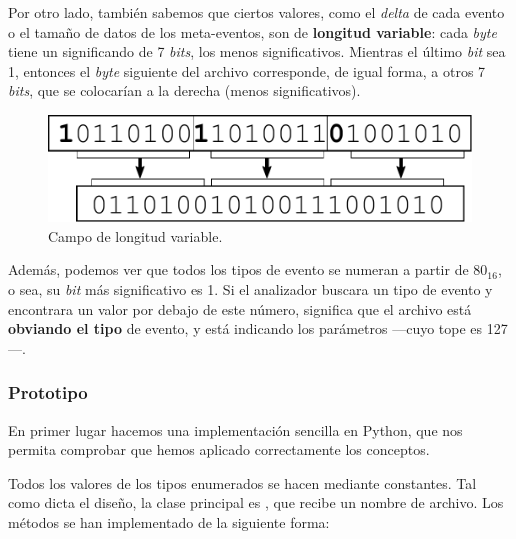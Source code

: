 \smallskip

Por otro lado, también sabemos que ciertos valores, como el \textit{delta} de cada evento o el tamaño de datos de los meta-eventos, son de \textbf{longitud variable}: cada \textit{byte} tiene un significando de 7 \textit{bits}, los menos significativos. Mientras el último \textit{bit} sea 1, entonces el \textit{byte} siguiente del archivo corresponde, de igual forma, a otros 7 \textit{bits}, que se colocarían a la derecha (menos significativos).

\smallskip

\begin{figure}[H]
	\noindent \begin{centering}
		\includegraphics[width=\linewidth/2]{capitulo5/varlen}
		\par\end{centering}
	\smallskip
	\caption{\label{fig:varlen} Campo de longitud variable.}
\end{figure}

\smallskip

Además, podemos ver que todos los tipos de evento se numeran a partir de $80_{16}$, o sea, su \textit{bit} más significativo es 1. Si el analizador buscara un tipo de evento y encontrara un valor por debajo de este número, significa que el archivo está \textbf{obviando el tipo} de evento, y está indicando los parámetros ---cuyo tope es 127---.

\subsubsection{Prototipo}

En primer lugar hacemos una implementación sencilla en Python, que nos permita comprobar que hemos aplicado correctamente los conceptos.

Todos los valores de los tipos enumerados se hacen mediante constantes. Tal como dicta el diseño, la clase principal es , que recibe un nombre de archivo. Los métodos se han implementado de la siguiente forma:

